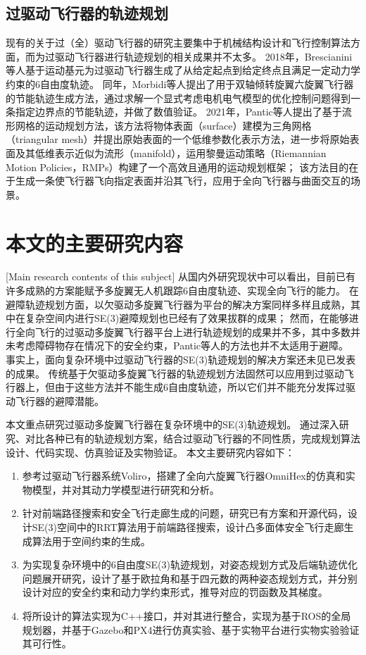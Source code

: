 \subsection{过驱动飞行器的轨迹规划}
现有的关于过（全）驱动飞行器的研究主要集中于机械结构设计和飞行控制算法方面，而为过驱动飞行器进行轨迹规划的相关成果并不太多。
2018年，Brescianini等人基于运动基元为过驱动飞行器生成了从给定起点到给定终点且满足一定动力学约束的6自由度轨迹\cite{brescianini2018computationally}。
同年，Morbidi等人提出了用于双轴倾转旋翼六旋翼飞行器的节能轨迹生成方法\cite{morbidi2018energy}，通过求解一个显式考虑电机电气模型的优化控制问题得到一条指定边界点的节能轨迹，并做了数值验证。
2021年，Pantic等人提出了基于流形网格的运动规划方法\cite{pantic2021mesh}，该方法将物体表面（surface）建模为三角网格（triangular mesh）并提出原始表面的一个低维参数化表示方法，进一步将原始表面及其低维表示近似为流形（manifold），运用黎曼运动策略（Riemannian Motion Policies，RMPs）构建了一个高效且通用的运动规划框架；
该方法目的在于生成一条使飞行器飞向指定表面并沿其飞行，应用于全向飞行器与曲面交互的场景。

\section{本文的主要研究内容}[Main research contents of this subject]
从国内外研究现状中可以看出，目前已有许多成熟的方案能赋予多旋翼无人机跟踪6自由度轨迹、实现全向飞行的能力。
在避障轨迹规划方面，以欠驱动多旋翼飞行器为平台的解决方案同样多样且成熟，其中在复杂空间内进行SE(3)避障规划也已经有了效果拔群的成果；
然而，在能够进行全向飞行的过驱动多旋翼飞行器平台上进行轨迹规划的成果并不多，其中多数\cite{brescianini2018computationally, morbidi2018energy}并未考虑障碍物存在情况下的安全约束，Pantic等人的方法\cite{pantic2021mesh}也并不太适用于避障。
事实上，面向复杂环境中过驱动飞行器的SE(3)轨迹规划的解决方案还未见已发表的成果。
传统基于欠驱动多旋翼飞行器的轨迹规划方法固然可以应用到过驱动飞行器上，但由于这些方法并不能生成6自由度轨迹，所以它们并不能充分发挥过驱动飞行器的避障潜能。

本文重点研究过驱动多旋翼飞行器在复杂环境中的SE(3)轨迹规划。
通过深入研究、对比各种已有的轨迹规划方案，结合过驱动飞行器的不同性质，完成规划算法设计、代码实现、仿真验证及实物验证。
本文主要研究内容如下：
\begin{enumerate}
    \renewcommand{\labelenumi}{(\theenumi)}
    \item 参考过驱动飞行器系统Voliro\cite{kamel2018voliro}，搭建了全向六旋翼飞行器OmniHex的仿真和实物模型，并对其动力学模型进行研究和分析。
    \item 针对前端路径搜索和安全飞行走廊生成的问题，研究已有方案和开源代码，设计SE(3)空间中的RRT算法用于前端路径搜索，设计凸多面体安全飞行走廊生成算法用于空间约束的生成。
    \item 为实现复杂环境中的6自由度SE(3)轨迹规划，对姿态规划方式及后端轨迹优化问题展开研究，设计了基于欧拉角和基于四元数的两种姿态规划方式，并分别设计对应的安全约束和动力学约束形式，推导对应的罚函数及其梯度。
    \item 将所设计的算法实现为C++接口，并对其进行整合，实现为基于ROS\cite{quigley2009ros}的全局规划器，并基于Gazebo\cite{gazebo}和PX4\cite{meier2015px4}进行仿真实验、基于实物平台进行实物实验验证其可行性。
\end{enumerate}

